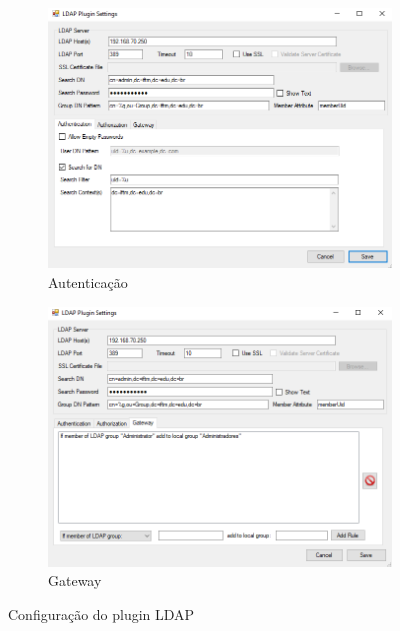 \begin{figure}[ht]
    \begin{subfigure}{0.48\textwidth}
    	\centering
    	\includegraphics[width=\linewidth]{textuais/PGina4.png}
    	\caption{Autenticação
    	\label{fig:pgina4}}
    \end{subfigure}%
    \hspace{0.04\textwidth} %
    \begin{subfigure}{0.48\textwidth}
    	\centering
    	\includegraphics[width=\linewidth]{textuais/PGina5.png}
    	\caption{Gateway
    	\label{fig:pGina5}}
    \end{subfigure}
    \caption{Configuração do plugin LDAP}
    \label{fig:figuras}
\end{figure}